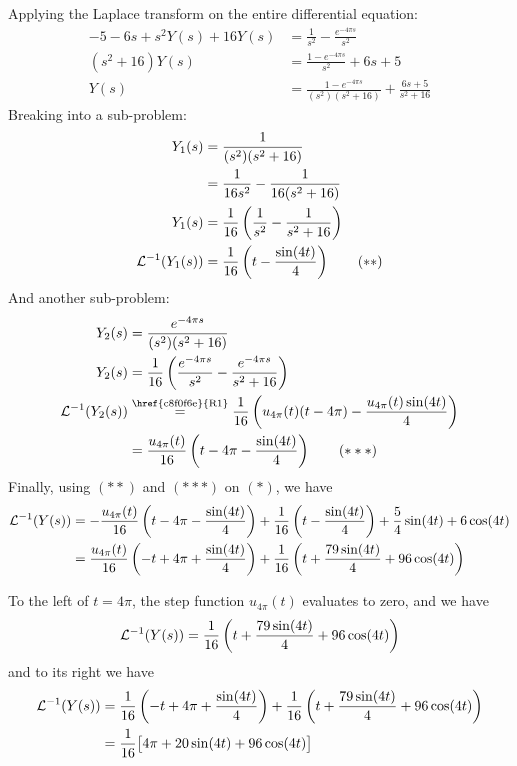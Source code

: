 Applying the Laplace transform on the entire differential equation:
\begin{align*}
	-5-6s+s^2Y(s)+16Y(s) & = \frac1{s^2}-\frac{e^{-4\pi s}}{s^2}                                 \\
	(s^2+16)Y(s)         & = \frac{1-e^{-4\pi s}}{s^2}+6s+5                                      \\
	Y(s)                 & = \frac{1-e^{-4\pi s}}{(s^2)(s^2+16)}+\frac{6s+5}{s^2+16}\tag*{($*$)}
\end{align*}
Breaking into a sub-problem:
\begin{align*}
	Y_1(s)      & =\frac1{(s^2)(s^2+16)}                                      \\
	            & =\frac{1}{16s^2}-\frac{1}{16(s^2+16)}                       \\
	Y_1(s)      & =\frac{1}{16}\left(\frac{1}{s^2}-\frac{1}{s^2+16}\right)    \\
	\mathcal L^{-1}(Y_1(s)) & =\frac{1}{16}\left(t-\frac{\sin(4t)}{4}\right)\tag*{($**$)}
\end{align*}
And another sub-problem:
\begin{align*}
	Y_2(s)      & =\frac{e^{-4\pi s}}{(s^2)(s^2+16)}                                                                                     \\
	Y_2(s)      & =\frac{1}{16}\left(\frac{e^{-4\pi s}}{s^2}-\frac{e^{-4\pi s}}{s^2+16}\right)                                           \\
	\LI(Y_2(s)) & \stackrel{\text{\href{c8f0f6e}{R1}}}{=}\frac{1}{16}\left(u_{4\pi}(t)(t-4\pi)-\frac{u_{4\pi}(t)\sin(4t)}{4}\right) \\
	            & =\frac{u_{4\pi}(t)}{16}\left(t-4\pi-\frac{\sin(4t)}{4}\right)\tag*{($***$)}
\end{align*}
Finally, using $(**)$ and $(***)$ on $(*)$, we have
\begin{align*}
	\mathcal L^{-1}(Y(s))
	 & = -\frac{u_{4\pi}(t)}{16}\left(t-4\pi-\frac{\sin(4t)}{4}\right)+
	\frac{1}{16}\left(t-\frac{\sin(4t)}{4}\right)+
	\frac54\sin(4t)+6\cos(4t)                                           \\
	 & = \frac{u_{4\pi}(t)}{16}\left(-t+4\pi+\frac{\sin(4t)}{4}\right)+
	\frac{1}{16}\left(t+\frac{79\sin(4t)}{4}+96\cos(4t)\right)
\end{align*}

To the left of $t=4\pi$, the step function $u_{4\pi}(t)$ evaluates to
zero, and we have
$$
	\mathcal L^{-1}(Y(s))=\frac{1}{16}\left(t+\frac{79\sin(4t)}{4}+96\cos(4t)\right)
$$
and to its right we have
\begin{align*}
	\mathcal L^{-1}(Y(s))
	 & = \frac{1}{16}\left(-t+4\pi+\frac{\sin(4t)}{4}\right)+
	\frac{1}{16}\left(t+\frac{79\sin(4t)}{4}+96\cos(4t)\right) \\
	 & =\frac{1}{16}\big[4\pi+20\sin(4t)+96\cos(4t)\big]       \\
\end{align*}

